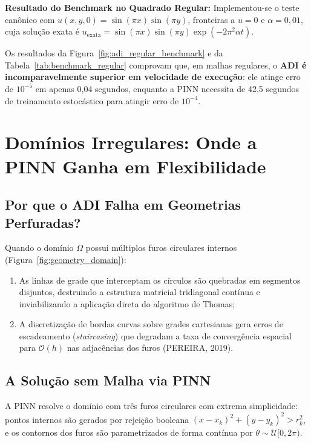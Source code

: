 \documentclass[11pt,a4paper]{article}
\begin{document}
\textbf{Resultado do Benchmark no Quadrado Regular:} Implementou-se o teste canônico com $u(x,y,0) = \sin(\pi x)\sin(\pi y)$, fronteiras a $u=0$ e $\alpha = 0{,}01$, cuja solução exata é $u_{\text{exata}} = \sin(\pi x)\sin(\pi y)\exp(-2\pi^2\alpha t)$. 

Os resultados da Figura~\ref{fig:adi_regular_benchmark} e da Tabela~\ref{tab:benchmark_regular} comprovam que, em malhas regulares, o \textbf{ADI é incomparavelmente superior em velocidade de execução}: ele atinge erro de $10^{-5}$ em apenas 0,04 segundos, enquanto a PINN necessita de 42,5 segundos de treinamento estocástico para atingir erro de $10^{-4}$.

\section{Domínios Irregulares: Onde a PINN Ganha em Flexibilidade}

\subsection{Por que o ADI Falha em Geometrias Perfuradas?}

Quando o domínio $\Omega$ possui múltiplos furos circulares internos (Figura~\ref{fig:geometry_domain}):
\begin{enumerate}
  \item As linhas de grade que interceptam os círculos são quebradas em segmentos disjuntos, destruindo a estrutura matricial tridiagonal contínua e inviabilizando a aplicação direta do algoritmo de Thomas;
  \item A discretização de bordas curvas sobre grades cartesianas gera erros de escadeamento (\textit{staircasing}) que degradam a taxa de convergência espacial para $\mathcal{O}(h)$ nas adjacências dos furos (PEREIRA, 2019).
\end{enumerate}

\subsection{A Solução sem Malha via PINN}

A PINN resolve o domínio com três furos circulares com extrema simplicidade: pontos internos são gerados por rejeição booleana $(x - x_k)^2 + (y - y_k)^2 > r_k^2$, e os contornos dos furos são parametrizados de forma contínua por $\theta \sim \mathcal{U}[0, 2\pi)$.
\end{document}
